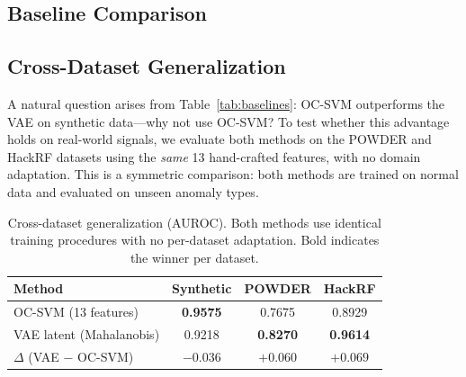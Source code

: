 \documentclass[conference]{IEEEtran}
\begin{document}
\subsection{Baseline Comparison}
\begin{table}[t]
\caption{Comparison with baseline methods (synthetic data). 95\% confidence intervals computed via bootstrap ($n=5000$). All pairwise differences vs.\ VAE Latent are statistically significant (Wilcoxon signed-rank, $p < 10^{-3}$).}
\label{tab:baselines}
\centering
{}
\end{table}

\subsection{Cross-Dataset Generalization}
A natural question arises from Table~\ref{tab:baselines}: OC-SVM outperforms the VAE on synthetic data---why not use OC-SVM? To test whether this advantage holds on real-world signals, we evaluate both methods on the POWDER and HackRF datasets using the \emph{same} 13 hand-crafted features, with no domain adaptation. This is a symmetric comparison: both methods are trained on normal data and evaluated on unseen anomaly types.

\begin{table}[t]
\caption{Cross-dataset generalization (AUROC). Both methods use identical training procedures with no per-dataset adaptation. Bold indicates the winner per dataset.}
\label{tab:generalization}
\centering
\begin{tabular}{@{}lccc@{}}
\toprule
Method & Synthetic & POWDER & HackRF \\
\midrule
OC-SVM (13 features) & \textbf{0.9575} & 0.7675 & 0.8929 \\
VAE latent (Mahalanobis) & 0.9218 & \textbf{0.8270} & \textbf{0.9614} \\
\midrule
$\Delta$ (VAE $-$ OC-SVM) & $-0.036$ & $+0.060$ & $+0.069$ \\
\bottomrule
\end{tabular}
\end{table}
\end{document}
